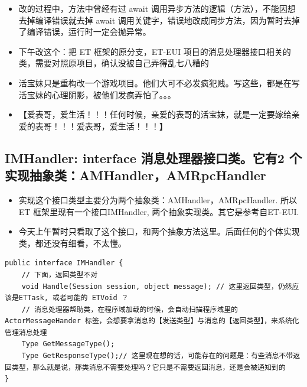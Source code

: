 \documentclass[9pt, b5paper]{article}
\begin{document}
\begin{itemize}
\begin{itemize}
\item 改的过程中，方法中曾经有过 await 调用异步方法的逻辑（方法），不能因想去掉编译错误就去掉 await 调用关键字，错误地改成同步方法，因为暂时去掉了编译错误，运行时一定会抛异常。
\item 下午改这个：把 ET 框架的原分支，ET-EUI 项目的消息处理器接口相关的类，需要对照原项目，确认没被自己弄得乱七八糟的
\item 活宝妹只是重构改一个游戏项目。他们大可不必发疯犯贱。写这些，都是在写活宝妹的心理阴影，被他们发疯弄怕了。。。
\item 【爱表哥，爱生活！！！任何时候，亲爱的表哥的活宝妹，就是一定要嫁给亲爱的表哥！！！爱表哥，爱生活！！！】
\end{itemize}
\end{itemize}
\subsection{IMHandler: interface 消息处理器接口类。它有2 个实现抽象类：AMHandler，AMRpcHandler}
\label{sec:org02c7e67}
\begin{itemize}
\item 实现这个接口类型主要分为两个抽象类：AMHandler，AMRpcHandler. 所以ET 框架里现有一个接口IMHandler, 两个抽象实现类。其它是参考自ET-EUI.
\item 今天上午暂时只看取了这个接口，和两个抽象方法这里。后面任何的个体实现类，都还没有细看，不太懂。
\end{itemize}
\begin{verbatim}
public interface IMHandler {
    // 下面，返回类型不对
    void Handle(Session session, object message); // 这里返回类型，仍然应该是ETTask, 或者可能的 ETVoid ？
    // 消息处理器帮助类，在程序域加载的时候，会自动扫描程序域里的ActorMessageHander 标签，会想要拿消息的【发送类型】与消息的【返回类型】，来系统化管理消息处理 
    Type GetMessageType();
    Type GetResponseType();// 这里现在想的话，可能存在的问题是：有些消息不带返回类型，那么就是说，那类消息不需要处理吗？它只是不需要返回消息，还是会被通知到的 
}
\end{verbatim}
\end{document}
